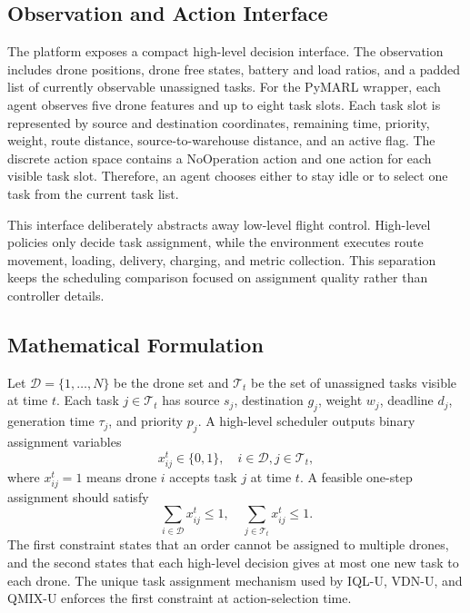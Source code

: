 \documentclass[sigconf,balance=false]{aamas}
\begin{document}
\subsection{Observation and Action Interface}

The platform exposes a compact high-level decision interface. The observation includes drone positions, drone free states, battery and load ratios, and a padded list of currently observable unassigned tasks. For the PyMARL wrapper, each agent observes five drone features and up to eight task slots. Each task slot is represented by source and destination coordinates, remaining time, priority, weight, route distance, source-to-warehouse distance, and an active flag. The discrete action space contains a NoOperation action and one action for each visible task slot. Therefore, an agent chooses either to stay idle or to select one task from the current task list.

This interface deliberately abstracts away low-level flight control. High-level policies only decide task assignment, while the environment executes route movement, loading, delivery, charging, and metric collection. This separation keeps the scheduling comparison focused on assignment quality rather than controller details.

\subsection{Mathematical Formulation}

Let $\mathcal{D}=\{1,\ldots,N\}$ be the drone set and $\mathcal{T}_t$ be the set of unassigned tasks visible at time $t$. Each task $j\in \mathcal{T}_t$ has source $s_j$, destination $g_j$, weight $w_j$, deadline $d_j$, generation time $\tau_j$, and priority $p_j$. A high-level scheduler outputs binary assignment variables
\begin{equation}
x_{ij}^{t}\in\{0,1\},\quad i\in\mathcal{D}, j\in\mathcal{T}_t,
\end{equation}
where $x_{ij}^{t}=1$ means drone $i$ accepts task $j$ at time $t$. A feasible one-step assignment should satisfy
\begin{equation}
\sum_{i\in\mathcal{D}} x_{ij}^{t}\leq 1,\quad
\sum_{j\in\mathcal{T}_t} x_{ij}^{t}\leq 1.
\end{equation}
The first constraint states that an order cannot be assigned to multiple drones, and the second states that each high-level decision gives at most one new task to each drone. The unique task assignment mechanism used by IQL-U, VDN-U, and QMIX-U enforces the first constraint at action-selection time.
\end{document}

